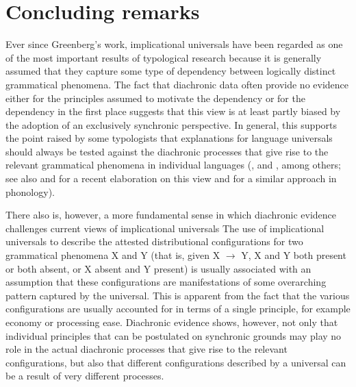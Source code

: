 \documentclass[output=paper]{langsci/langscibook}
\begin{document}
\largerpage
\section{Concluding remarks}
Ever since Greenberg's work, implicational universals  have been regarded as one of the most important results of typological 
research because it is generally assumed that they capture some type of dependency between
logically distinct grammatical phenomena. The fact that diachronic 
data  often provide no evidence either for the principles assumed to
motivate the dependency or for the dependency in the first place
suggests that this view is at least partly biased by the adoption of
an exclusively synchronic  perspective. In general, this supports the point raised by some typologists
that explanations for language universals should always be tested
against the
diachronic  processes that give rise to the relevant grammatical
phenomena in individual languages (\citealt{Bybee1988},
\citeyear{Bybee2006} and \citeyear{Bybee2008}, among others; see
also \citealt{Otareferential} and  for a recent elaboration on this view
and \citealt{Blevins2004} for a
similar approach in phonology). 

There also is, however, a more fundamental
sense in which diachronic evidence challenges current
views of implicational universals   The use of implicational universals
to describe the attested distributional configurations for two grammatical
phenomena X and Y (that is,  given X $\rightarrow$ Y, X and Y both
present or both absent, or X absent and Y present) is usually associated with
an assumption that these configurations are manifestations of some
overarching pattern captured by the universal. 
This is
apparent from the fact that the various configurations are usually
accounted for in terms of a single principle, for example economy or
processing ease.  Diachronic  evidence shows, however, not only that individual principles that
can be postulated on synchronic  grounds may play no role in the actual
diachronic processes that give rise to the relevant configurations,
but also that 
different configurations described by a universal can be a result of very
different processes. 
\end{document}
